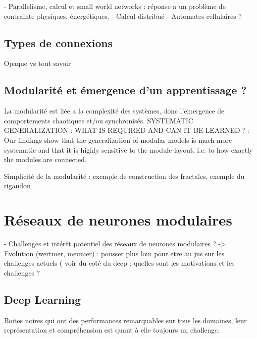 - Parallelisme, calcul et small world networks : réponse a un problème de contrainte physiques, énergétiques. 
- Calcul distribué 
- Automates cellulaires  ?


\subsection{Types de connexions}

Opaque vs tout savoir

\subsection{Modularité et émergence d'un apprentissage ? }

La modularité est liée a la complexité des systèmes, donc l'emergence de comportements chaotiques et/ou synchronisés. 
SYSTEMATIC GENERALIZATION : WHAT IS REQUIRED
AND CAN IT BE LEARNED ? : 
Our findings show that the generalization of modular models is much more systematic and that it is highly sensitive to the module layout, i.e. to how exactly the modules are connected.

Simplicité de la modularité : exemple de construction des fractales, exemple du rigaudon


\section{Réseaux de neurones modulaires}

- Challenges et intérêt potentiel des réseaux de neurones modulaires ? -> Evolution (wertmer, meunier) : pousser plus loin pour etre au jus sur les challenges actuels ( voir du coté du deep : quelles sont les motivations et les challenges ? 



\subsection{Deep Learning}

Boites noires qui ont des performances remarquables sur tous les domaines, leur représentation et compréhension est quant à elle toujours un challenge.

